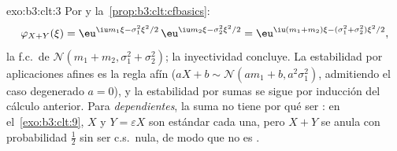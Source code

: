 \begin{solution}{exo:b3:clt:3}
Por  y
la~\cref{prop:b3:clt:cfbasics}:
\[
\varphi_{X+Y}(\xi) = \eu^{\iu m_1\xi - \sigma_1^2\xi^2/2}\,
\eu^{\iu m_2\xi - \sigma_2^2\xi^2/2}
= \eu^{\iu(m_1+m_2)\xi - (\sigma_1^2+\sigma_2^2)\xi^2/2},
\]
la f.c.\ de $\mathcal N(m_1 + m_2, \sigma_1^2 + \sigma_2^2)$; la
inyectividad concluye. La estabilidad por aplicaciones afines es la
regla afín ($aX + b \sim \mathcal N(am_1 + b,
a^2\sigma_1^2)$, admitiendo el caso degenerado $a = 0$), y la
estabilidad por sumas
 se sigue por
inducción del cálculo anterior. Para
 \emph{dependientes}, la
suma no tiene por qué ser :
en el~\cref{exo:b3:clt:9}, $X$ y $Y =
\varepsilon X$ son 
estándar cada una, pero $X + Y$ se anula con probabilidad $\frac12$ sin
ser c.s.\ nula, de modo que no es
.
\end{solution}

